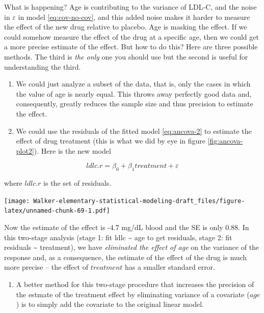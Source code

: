 \documentclass[]{book}
\providecommand{\tightlist}{%
  \setlength{\itemsep}{0pt}\setlength{\parskip}{0pt}}
\begin{document}
What is happening? Age is contributing to the variance of LDL-C, and the
noise in \(\varepsilon\) in model \eqref{eq:cov-no-cov}, and this added
noise makes it harder to measure the effect of the new drug relative to
placebo. Age is masking the effect. If we could somehow measure the
effect of the drug at a specific age, then we could get a more precise
estimate of the effect. But how to do this? Here are three possible
methods. The third is \emph{the only} one you should use but the second
is useful for understanding the third.

\begin{enumerate}
\def\labelenumi{\arabic{enumi}.}
\item
  We could just analyze a subset of the data, that is, only the cases in
  which the value of age is nearly equal. This throws away perfectly
  good data and, consequently, greatly reduces the sample size and thus
  precision to estimate the effect.
\item
  We could use the residuals of the fitted model \eqref{eq:ancova-2} to
  estimate the effect of drug treatment (this is what we did by eye in
  figure \ref{fig:ancova-plot2}). Here is the new model
\end{enumerate}

\begin{equation}
ldlc.r = \beta_0 + \beta_1 treatment + \varepsilon
\label{eq:ancova-3}
\end{equation}

where \(ldlc.r\) is the set of residuals.

\texttt{[image: Walker-elementary-statistical-modeling-draft\_files/figure-latex/unnamed-chunk-69-1.pdf]}

Now the estimate of the effect is -4.7 mg/dL blood and the SE is only
0.88. In this two-stage analysis (stage 1: fit ldlc \textasciitilde{}
age to get residuals, stage 2: fit residuals \textasciitilde{}
treatment), we have \emph{eliminated the effect of age} on the variance
of the response and, as a consequence, the estimate of the effect of the
drug is much more precise -- the effect of \(treatment\) has a smaller
standard error.

\begin{enumerate}
\def\labelenumi{\arabic{enumi}.}
\setcounter{enumi}{2}
\tightlist
\item
  A better method for this two-stage procedure that increases the
  precision of the estmate of the treatment effect by eliminating
  variance of a covariate (\(age\)) is to simply add the covariate to
  the original linear model.
\end{enumerate}
\end{document}
